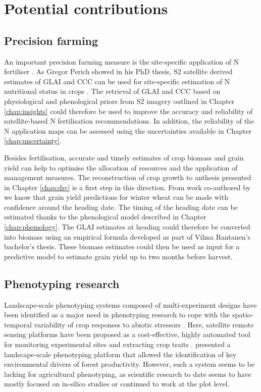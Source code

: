 \section{Potential contributions}

\subsection{Precision farming}
An important precision farming measure is the site-specific application of \gls{N} fertiliser \citep{argento_site-specific_2021}. As Gregor Perich showed in his PhD thesis, \gls{S2} satellite derived estimates of \gls{GLAI} and \gls{CCC} can be used for site-specific estimation of \gls{N} nutritional status in crops \citep{perich_satellite-based_2023}. The retrieval of \gls{GLAI} and \gls{CCC} based on physiological and phenological priors from \gls{S2} imagery outlined in Chapter \ref{chap:insights} could therefore be used to improve the accuracy and reliability of satellite-based N fertilisation recommendations. In addition, the reliability of the \gls{N} application maps can be assessed using the uncertainties available in Chapter \ref{chap:uncertainty}.

Besides fertilisation, accurate and timely estimates of crop biomass and grain yield can help to optimise the allocation of resources and the application of management measures. The reconstruction of crop growth to anthesis presented in Chapter \ref{chap:drc} is a first step in this direction. From work co-authored by \cite{amin_-season_2024} we know that grain yield predictions for winter wheat can be made with confidence around the heading date. The timing of the heading date can be estimated thanks to the phenological model described in Chapter \ref{chap:phemology}. The \gls{GLAI} estimates at heading could therefore be converted into biomass using an empirical formula developed as part of Vilma Rantanen's bachelor's thesis. These biomass estimates could then be used as input for a predictive model to estimate grain yield up to two months before harvest.

\subsection{Phenotyping research}
Landscape-scale phenotyping systems composed of multi-experiment designs have been identified as a major need in phenotyping research to cope with the spatio-temporal variability of crop responses to abiotic stressors \citep{smith_scaling_2021}. Here, satellite remote sensing platforms have been proposed as a cost-effective, highly automated tool for monitoring experimental sites and extracting crop traits \citep{zhang_high-resolution_2020, pinto_satellite_2023}. \cite{dungey_phenotyping_2018} presented a landscape-scale phenotyping platform that allowed the identification of key environmental drivers of forest productivity. However, such a system seems to be lacking for agricultural phenotyping, as scientific research to date seems to have mostly focused on in-silico studies \citep[for example]{waldner_high_2019} or continued to work at the plot level.

